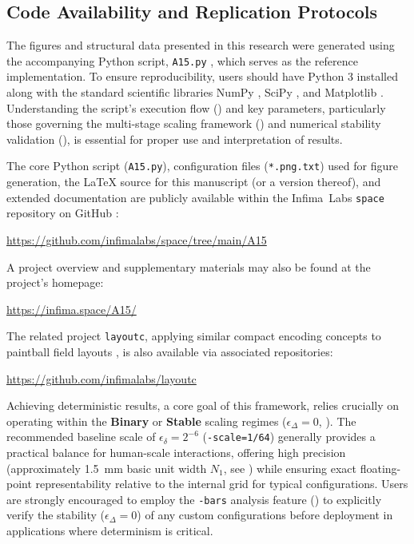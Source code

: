 \documentclass[10pt]{article}
\def\IL{Infima~Labs}
\begin{document}
\subsection{Code Availability and Replication Protocols}\label{subsec:replication}

The figures and structural data presented in this research were generated using the accompanying Python script, \texttt{A15.py} \cite{Risinger2024A15}, which serves as the reference implementation. To ensure reproducibility, users should have Python 3 installed along with the standard scientific libraries NumPy \cite{Harris2020}, SciPy \cite{Virtanen2020}, and Matplotlib \cite{Hunter2007}. Understanding the script's execution flow () and key parameters, particularly those governing the multi-stage scaling framework () and numerical stability validation (), is essential for proper use and interpretation of results.

The core Python script (\texttt{A15.py}), configuration files (\texttt{*.png.txt}) used for figure generation, the LaTeX source for this manuscript (or a version thereof), and extended documentation are publicly available within the \IL{} \texttt{space} repository on GitHub \cite{InfimaSpace}:
\begin{center}
    \url{https://github.com/infimalabs/space/tree/main/A15}
\end{center}
A project overview and supplementary materials may also be found at the project's homepage:
\begin{center}
    \url{https://infima.space/A15/}
\end{center}
The related project \texttt{layoutc}, applying similar compact encoding concepts to paintball field layouts \cite{Risinger2024Layoutc}, is also available via associated repositories:
\begin{center}
    \url{https://github.com/infimalabs/layoutc}
\end{center}

Achieving deterministic results, a core goal of this framework, relies crucially on operating within the \textbf{Binary} or \textbf{Stable} scaling regimes ($\epsilon_\Delta = 0$, ). The recommended baseline scale of $\epsilon_\delta = 2^{-6}$ (\texttt{-scale=1/64}) generally provides a practical balance for human-scale interactions, offering high precision (approximately \SI{1.5}{\milli\meter} basic unit width $N_1$, see ) while ensuring exact floating-point representability relative to the internal grid for typical configurations. Users are strongly encouraged to employ the \texttt{-bars} analysis feature () to explicitly verify the stability ($\epsilon_\Delta = 0$) of any custom configurations before deployment in applications where determinism is critical.
\end{document}
